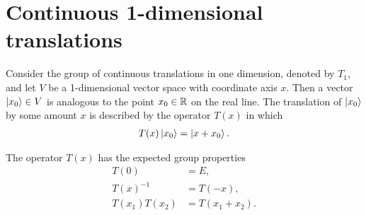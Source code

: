     \section{Continuous 1-dimensional translations}

    Consider the group of continuous translations in one dimension, denoted by $T_1$, and let $V$ be a 1-dimensional vector space with coordinate axis $x$. Then a vector $\ket{x_0}\in V$ is analogous to the point $x_0\in\mathbb{R}$ on the real line. The translation of $\ket{x_0}$ by some amount $x$ is described by the operator $T(x)$ in which
    \begin{align*}
        T(x)\ket{x_0} = \ket{x+x_0}.
    \end{align*}

    The operator $T(x)$ has the expected group properties
    \begin{align}
        T(0) &= E, \label{eq:P_BC} \\
        T(x)^{-1} &= T(-x), \label{eq:P_inv}\\
        T(x_1)T(x_2) &= T(x_1+x_2).\label{eq:P_add}
    \end{align}

